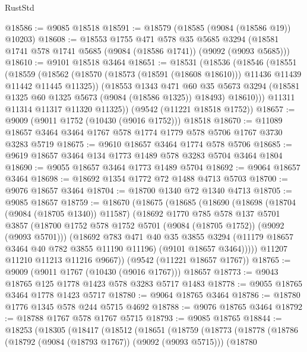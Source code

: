 \begin{lexlean}{RustStd}
\begin{coremodule}
@18586 := @9085 @18518
@18591 := @18579 (@18585 (@9084 (@18586 @19)) @10203)
@18608 := @18553
    @1755
    @471
    @578
    @35
    @5685
    @3294
    (@18581 @1741 @578 @1741 @5685 (@9084 (@18586 @1741)) (@9092 (@9093 @5685)))
@18610 := @9101 @18518 @3464
@18651 := @18531
    (@18536
      (@18546
        (@18551
          (@18559
            (@18562 (@18570 (@18573 (@18591 (@18608 @18610))) @11436 @11439 @11442 @11445 @11325))
            (@18553
              @1343
              @471
              @60
              @35
              @5673
              @3294
              (@18581 @1325 @60 @1325 @5673 (@9084 (@18586 @1325)) @18493)
              @18610)))
        @11311
        @11314
        @11317
        @11320
        @11325))
    (@9542 (@11221 @18518 @1752))
@18657 := @9009 (@9011 @1752 (@10430 (@9016 @1752))) @18518
@18670 := @11089 @18657 @3464 @3464 @1767 @578 @1774 @1779 @578 @5706 @1767 @3730 @3283 @5719
@18675 := @9610 @18657 @3464 @1774 @578 @5706
@18685 := @9619 @18657 @3464 @134 @1773 @1489 @578 @3283 @5704 @3464 @1804
@18690 := @9055 @18657 @3464 @1773 @1489 @5704
@18692 := @9064 @18657 @3464
@18698 := @18692 @1354 @1772 @72 @1488 @4713 @5703
@18700 := @9076 @18657 @3464
@18704 := @18700 @1340 @72 @1340 @4713
@18705 := @9085 @18657
@18759 := @18670
    (@18675
      (@18685
        (@18690
          (@18698
            (@18704 (@9084 (@18705 @1340)) @11587)
            (@18692
              @1770
              @785
              @578
              @137
              @5701
              @3857
              (@18700 @1752 @578 @1752 @5701 (@9084 (@18705 @1752)) (@9092 (@9093 @5701)))
              (@18692
                @783
                @471
                @40
                @35
                @3855
                @3294
                (@11179 @18657 @3464 @40 @782 @3855 @11190 @11196)
                (@9101 @18657 @3464)))))
        @11207
        @11210
        @11213
        @11216
        @9667))
    (@9542 (@11221 @18657 @1767))
@18765 := @9009 (@9011 @1767 (@10430 (@9016 @1767))) @18657
@18773 := @9043 @18765 @125 @1778 @1423 @578 @3283 @5717 @1483
@18778 := @9055 @18765 @3464 @1778 @1423 @5717
@18780 := @9064 @18765 @3464
@18786 := @18780 @1776 @1345 @578 @244 @5715 @4692
@18788 := @9076 @18765 @3464
@18792 := @18788 @1767 @578 @1767 @5715
@18793 := @9085 @18765
@18844 := @18253
    (@18305
      (@18417
        (@18512
          (@18651
            (@18759
              (@18773
                (@18778
                  (@18786
                    (@18792 (@9084 (@18793 @1767)) (@9092 (@9093 @5715)))
                    (@18780

\end{coremodule}
\end{lexlean}
